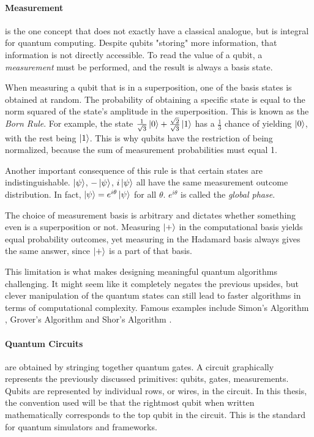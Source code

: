 \paragraph*{Measurement}
is the one concept that does not exactly have a classical analogue, but is integral for quantum computing.
Despite qubits "storing" more information, that information is not directly accessible.
To read the value of a qubit, a \emph{measurement} must be performed, and the result is always a basis state.

When measuring a qubit that is in a superposition, one of the basis states is obtained at random.
The probability of obtaining a specific state is equal to the norm squared of the state's amplitude in the superposition. This is known as the \emph{Born Rule}.
For example, the state $\frac{1}{\sqrt3}\ket{0} + \frac{\sqrt2}{\sqrt3}\ket{1}$ has a $\frac{1}{3}$ chance of yielding $\ket{0}$, with the rest being $\ket{1}$.
This is why qubits have the restriction of being normalized, because the sum of measurement probabilities must equal 1.

Another important consequence of this rule is that certain states are indistinguishable.
$\ket{\psi}$, $-\ket{\psi}$, $i\ket{\psi}$ all have the same measurement outcome distribution.
In fact, $\ket{\psi} = e^{i\theta}\ket{\psi}$ for all $\theta$. $e^{i\theta}$ is called the \emph{global phase}.

The choice of measurement basis is arbitrary and dictates whether something even is a superposition or not.
Measuring $\ket{+}$ in the computational basis yields equal probability outcomes, yet measuring in the Hadamard basis always gives the same answer, since $\ket{+}$ is a part of that basis.

This limitation is what makes designing meaningful quantum algorithms challenging. 
It might seem like it completely negates the previous upsides, but clever manipulation of the quantum states can still lead to faster algorithms in terms of computational complexity.
Famous examples include Simon's Algorithm \cite{simon1997power}, Grover's Algorithm \cite{grover1996fast} and Shor's Algorithm \cite{shor1994algorithms}.

\paragraph*{Quantum Circuits}
are obtained by stringing together quantum gates. A circuit graphically represents the previously discussed primitives: qubits, gates, measurements.
Qubits are represented by individual rows, or wires, in the circuit. In this thesis, the convention used will be that the rightmost qubit when written mathematically corresponds to the top qubit in the circuit.
This is the standard for quantum simulators and frameworks.

